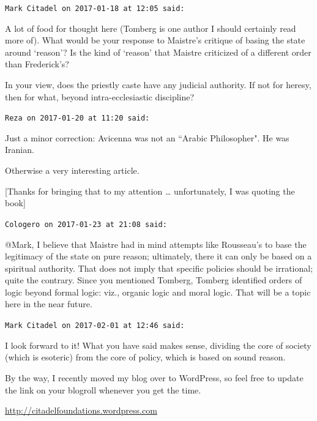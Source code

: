 \begin{footnotesize}\begin{sffamily}



\texttt{Mark Citadel on 2017-01-18 at 12:05 said: }

A lot of food for thought here (Tomberg is one author I should certainly read more of). What would be your response to Maistre's critique of basing the state around `reason'? Is the kind of `reason' that Maistre criticized of a different order than Frederick's?

In your view, does the priestly caste have any judicial authority. If not for heresy, then for what, beyond intra-ecclesiastic discipline?


\hfill

\texttt{Reza on 2017-01-20 at 11:20 said: }

Just a minor correction: Avicenna was not an ``Arabic Philosopher". He was Iranian.

Otherwise a very interesting article.

[Thanks for bringing that to my attention … unfortunately, I was quoting the book]


\hfill

\texttt{Cologero on 2017-01-23 at 21:08 said: }

@Mark, I believe that Maistre had in mind attempts like Rousseau's to base the legitimacy of the state on pure reason; ultimately, there it can only be based on a spiritual authority. That does not imply that specific policies should be irrational; quite the contrary. Since you mentioned Tomberg, Tomberg identified orders of logic beyond formal logic: viz., organic logic and moral logic. That will be a topic here in the near future.


\hfill

\texttt{Mark Citadel on 2017-02-01 at 12:46 said: }

I look forward to it! What you have said makes sense, dividing the core of society (which is esoteric) from the core of policy, which is based on sound reason.

By the way, I recently moved my blog over to WordPress, so feel free to update the link on your blogroll whenever you get the time.

\url{http://citadelfoundations.wordpress.com}


\hfill


\end{sffamily}\end{footnotesize}
